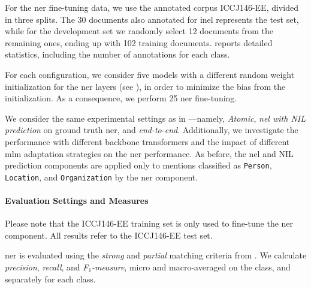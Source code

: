

For the \ac{ner} fine-tuning data, we use the annotated corpus ICCJ146-EE, divided in three splits. The 30 documents also annotated for \ac{inel} represents the test set, while for the development set we randomly select 12 documents from the remaining ones, ending up with 102 training documents.  
 reports detailed statistics, including the number of annotations for each class.



For each configuration, we consider five models with a different random weight initialization for the \ac{ner} layers (see ), in order to minimize the bias from the initialization. As a consequence, we perform 25 \ac{ner} fine-tuning.


We consider the same experimental settings as in ---namely, \textit{Atomic}, \textit{\ac{nel} with NIL prediction} on ground truth \ac{ner}, and \textit{end-to-end}. Additionally, we investigate the performance with different backbone transformers and the impact of different \ac{mlm} adaptation strategies on the \ac{ner} performance.
As before, the \ac{nel} and NIL prediction components are applied only to mentions classified as \texttt{Person}, \texttt{Location}, and \texttt{Organization} by the \ac{ner} component.

\paragraph{Evaluation Settings and Measures}

Please note that the ICCJ146-EE training set is only used to fine-tune the \ac{ner} component. All results refer to the ICCJ146-EE test set. 

\ac{ner} is evaluated using the \textit{strong} and \textit{partial} matching criteria from .
We calculate \textit{precision}, \textit{recall}, and \textit{F$_1$-measure}, micro and macro-averaged on the class, and separately for each class.

